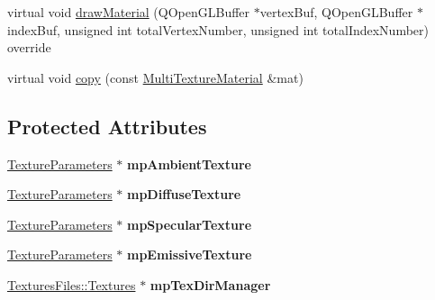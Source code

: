 \begin{DoxyCompactItemize}
\item 
virtual void \mbox{\hyperlink{class_geometry_engine_1_1_geometry_material_1_1_multi_texture_material_af6edaa5960d07b6abee870760e869189}{draw\+Material}} (Q\+Open\+G\+L\+Buffer $\ast$vertex\+Buf, Q\+Open\+G\+L\+Buffer $\ast$index\+Buf, unsigned int total\+Vertex\+Number, unsigned int total\+Index\+Number) override
\item 
virtual void \mbox{\hyperlink{class_geometry_engine_1_1_geometry_material_1_1_multi_texture_material_add208366ae882ad1bd9c6029969902b4}{copy}} (const \mbox{\hyperlink{class_geometry_engine_1_1_geometry_material_1_1_multi_texture_material}{Multi\+Texture\+Material}} \&mat)
\end{DoxyCompactItemize}
\subsection*{Protected Attributes}
\begin{DoxyCompactItemize}
\item 
\mbox{\label{class_geometry_engine_1_1_geometry_material_1_1_multi_texture_material_a4b0dabb3092d3d116d7f3b8d4fb3ddd1}} 
\mbox{\hyperlink{class_geometry_engine_1_1_geometry_material_1_1_texture_parameters}{Texture\+Parameters}} $\ast$ {\bfseries mp\+Ambient\+Texture}
\item 
\mbox{\label{class_geometry_engine_1_1_geometry_material_1_1_multi_texture_material_a13f23348dddc26dbf2470abd890f1fbe}} 
\mbox{\hyperlink{class_geometry_engine_1_1_geometry_material_1_1_texture_parameters}{Texture\+Parameters}} $\ast$ {\bfseries mp\+Diffuse\+Texture}
\item 
\mbox{\label{class_geometry_engine_1_1_geometry_material_1_1_multi_texture_material_ad395a5b8d93093fbbc5cff61cf73e57e}} 
\mbox{\hyperlink{class_geometry_engine_1_1_geometry_material_1_1_texture_parameters}{Texture\+Parameters}} $\ast$ {\bfseries mp\+Specular\+Texture}
\item 
\mbox{\label{class_geometry_engine_1_1_geometry_material_1_1_multi_texture_material_a7ccad13c06e24303ac569e27b2ebb23a}} 
\mbox{\hyperlink{class_geometry_engine_1_1_geometry_material_1_1_texture_parameters}{Texture\+Parameters}} $\ast$ {\bfseries mp\+Emissive\+Texture}
\item 
\mbox{\label{class_geometry_engine_1_1_geometry_material_1_1_multi_texture_material_a65c010985839ed21612ccde50231b4bd}} 
\mbox{\hyperlink{class_textures_files_1_1_textures}{Textures\+Files\+::\+Textures}} $\ast$ {\bfseries mp\+Tex\+Dir\+Manager}
\end{DoxyCompactItemize}
